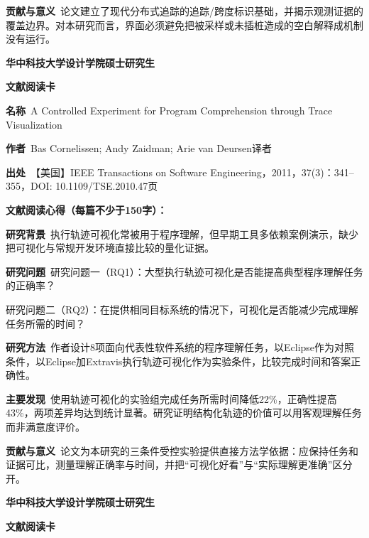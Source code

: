 \noindent\textbf{贡献与意义}\ 论文建立了现代分布式追踪的追踪/跨度标识基础，并揭示观测证据的覆盖边界。对本研究而言，界面必须避免把被采样或未插桩造成的空白解释成机制没有运行。\par
\clearpage
\begin{center}
{\songti\bfseries\fontsize{18.5pt}{27.75pt}\selectfont 华中科技大学设计学院硕士研究生\par}
{\songti\bfseries\fontsize{18.5pt}{27.75pt}\selectfont 文献阅读卡\par}
\end{center}
\vspace{0.25em}
\noindent\underline{}\par
\vspace{0.35em}
\noindent\textbf{名称}\ A Controlled Experiment for Program Comprehension through Trace Visualization\par
\noindent\textbf{作者}\ Bas Cornelissen; Andy Zaidman; Arie van Deursen\quad 译者\par
\noindent\textbf{出处}\ 【美国】IEEE Transactions on Software Engineering，2011，37(3)：341–355，DOI: 10.1109/TSE.2010.47\quad 页\par
\vspace{0.35em}
\noindent\textbf{文献阅读心得（每篇不少于150字）：}\par
\noindent\textbf{研究背景}\ 执行轨迹可视化常被用于程序理解，但早期工具多依赖案例演示，缺少把可视化与常规开发环境直接比较的量化证据。\par
\noindent\textbf{研究问题}\ 研究问题一（RQ1）：大型执行轨迹可视化是否能提高典型程序理解任务的正确率？\par
研究问题二（RQ2）：在提供相同目标系统的情况下，可视化是否能减少完成理解任务所需的时间？\par
\noindent\textbf{研究方法}\ 作者设计8项面向代表性软件系统的程序理解任务，以Eclipse作为对照条件，以Eclipse加Extravis执行轨迹可视化作为实验条件，比较完成时间和答案正确性。\par
\noindent\textbf{主要发现}\ 使用轨迹可视化的实验组完成任务所需时间降低22\%，正确性提高43\%，两项差异均达到统计显著。研究证明结构化轨迹的价值可以用客观理解任务而非满意度评价。\par
\noindent\textbf{贡献与意义}\ 论文为本研究的三条件受控实验提供直接方法学依据：应保持任务和证据可比，测量理解正确率与时间，并把“可视化好看”与“实际理解更准确”区分开。\par
\clearpage
\begin{center}
{\songti\bfseries\fontsize{18.5pt}{27.75pt}\selectfont 华中科技大学设计学院硕士研究生\par}
{\songti\bfseries\fontsize{18.5pt}{27.75pt}\selectfont 文献阅读卡\par}
\end{center}
